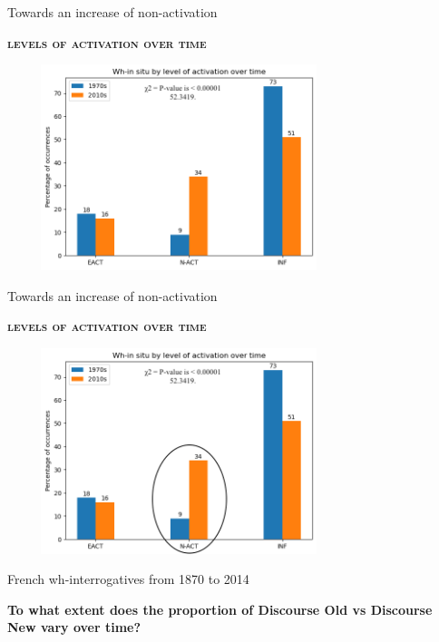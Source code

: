 \documentclass[lesson_slides]{subfiles}
\begin{document}
\begin{frame}[c]{Towards an increase of non-activation}

    \textbf{\textsc{levels of activation over time}}
    \begin{center}
        \includegraphics[width=10cm, height=6cm]{images/activationsallb2.png}
    \end{center}
  
\end{frame}
\begin{frame}[c]{Towards an increase of non-activation}

    \textbf{\textsc{levels of activation over time}}
    \begin{center}
        \includegraphics[width=10cm, height=6cm]{images/activationsallb3.png}
    \end{center}
  
\end{frame}
\begin{frame}[c]{French wh-interrogatives from 1870 to 2014}

    \begin{center}
        \textbf{To what extent does the proportion of Discourse Old vs Discourse New vary over time?}
    \end{center}
  
\end{frame}
\end{document}
